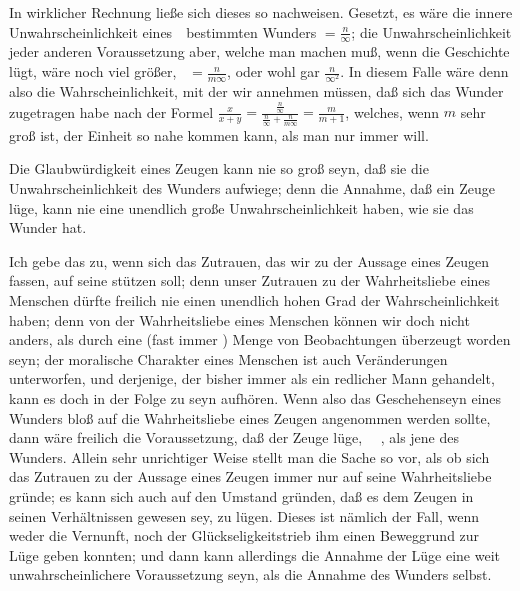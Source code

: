 \begin{aufza}
\begin{aufzb}
\item  In wirklicher Rechnung ließe sich dieses so nachweisen. Gesetzt, es wäre die innere Unwahrscheinlichkeit eines~\ bestimmten Wunders $= \frac{n}{\infty}$; die Unwahrscheinlichkeit jeder anderen Voraussetzung aber, welche man machen muß, wenn die Geschichte lügt, wäre noch viel größer, \zB\ $= \frac{n}{m \infty}$, oder wohl gar $\frac{n}{\infty^2}$. In diesem Falle wäre denn also die Wahrscheinlichkeit, mit der wir annehmen müssen, daß sich das Wunder zugetragen habe nach der Formel $\frac{x}{x+y} =  \frac{\frac{n}{\infty}}{\frac{n}{\infty}+\frac{n}{m \infty}} =  \frac{m}{m+1}$, welches, wenn $m$ sehr groß ist, der Einheit so nahe kommen kann, als man nur immer will.
\end{aufzb}
\end{aufza}


\begin{center}\end{center}

Die Glaubwürdigkeit eines Zeugen kann nie so groß seyn, daß sie die Unwahrscheinlichkeit des Wunders aufwiege; denn die Annahme, daß ein Zeuge lüge, kann nie eine unendlich große Unwahrscheinlichkeit haben, wie sie das Wunder hat.\par

\begin{center}\end{center}

Ich gebe das zu, wenn sich das Zutrauen, das wir zu der Aussage eines Zeugen fassen, auf seine  stützen soll; denn unser Zutrauen zu der Wahrheitsliebe eines Menschen dürfte freilich nie einen unendlich hohen Grad der Wahrscheinlichkeit haben; denn von der Wahrheitsliebe eines Menschen können wir doch nicht anders, als durch eine  (fast immer ) Menge von Beobachtungen überzeugt worden seyn; der moralische Charakter eines Menschen ist auch Veränderungen unterworfen, und derjenige, der bisher immer als ein redlicher Mann gehandelt, kann es doch in der Folge zu seyn aufhören. Wenn also das Geschehenseyn eines Wunders bloß auf die Wahrheitsliebe eines Zeugen angenommen werden sollte, dann wäre freilich die Voraussetzung, daß der Zeuge lüge, ~\ , als jene des Wunders. Allein sehr unrichtiger Weise stellt man die Sache so vor, als ob sich das Zutrauen zu der Aussage eines Zeugen immer nur auf seine Wahrheitsliebe gründe; es kann sich auch auf den Umstand gründen, daß es dem Zeugen in seinen Verhältnissen  gewesen sey, zu lügen. Dieses ist nämlich der Fall, wenn weder die Vernunft, noch der Glückseligkeitstrieb ihm einen Beweggrund zur Lüge geben konnten; und dann kann allerdings die Annahme der Lüge eine weit unwahrscheinlichere Voraussetzung seyn, als die Annahme des Wunders selbst.

